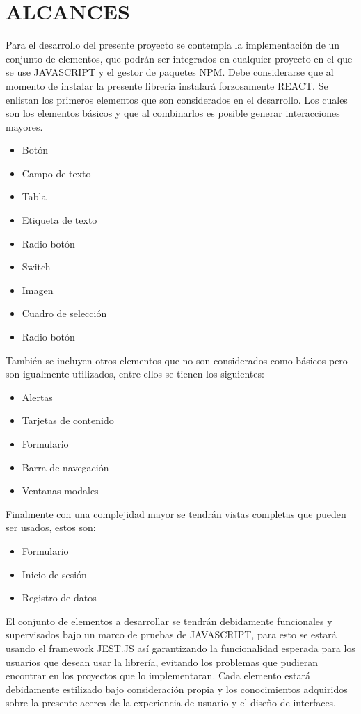 \section{ALCANCES}

Para el desarrollo del presente proyecto se contempla la implementación de un conjunto de elementos, que podrán ser integrados en cualquier proyecto en el que se use JAVASCRIPT y el gestor de paquetes NPM. Debe considerarse que al momento de instalar la presente librería instalará forzosamente REACT.
 \newline
Se enlistan los primeros elementos que son considerados en el desarrollo. Los cuales son los elementos básicos y que al combinarlos es posible generar interacciones mayores.
 \newline
\begin{itemize}
\item Botón 
\item Campo de texto
\item Tabla
\item Etiqueta de texto
\item Radio botón
\item Switch
\item Imagen
\item Cuadro de selección
\item Radio botón 
\end{itemize}
 \newline
También se incluyen otros elementos que no son considerados como básicos pero son  igualmente utilizados, entre ellos se tienen los siguientes:
 \newline
 \begin{itemize}
\item  Alertas
\item Tarjetas de contenido
\item Formulario
\item Barra de navegación
\item Ventanas modales
\end{itemize}
\newline
 Finalmente con una complejidad mayor se tendrán vistas completas que pueden ser usados, estos son:
  \newline
 \begin{itemize}
\item  Formulario
\item Inicio de sesión
\item Registro de datos
\end{itemize}
\newline
El conjunto de elementos a desarrollar se tendrán debidamente funcionales y supervisados bajo un marco de pruebas de JAVASCRIPT, para esto se estará usando el framework JEST.JS así garantizando la funcionalidad esperada para los usuarios que desean usar la librería, evitando los problemas que pudieran encontrar en los proyectos que lo implementaran. 
Cada elemento estará debidamente estilizado bajo consideración propia y los conocimientos adquiridos sobre la presente acerca de la experiencia de usuario y el diseño de interfaces.

